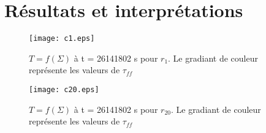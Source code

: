 \section{Résultats et interprétations}

\begin{figure}
  \begin{center}
    \texttt{[image: c1.eps]}
  \end{center}
  \caption{$T=f(\Sigma)$ à t = 26141802 s pour $r_{1}$. Le gradiant de couleur représente les valeurs de $\tau_{ff}$}
  \label{fig:c1.eps}
\end{figure} 

\begin{figure}
  \begin{center}
    \texttt{[image: c20.eps]}
  \end{center}
  \caption{$T=f(\Sigma)$ à t = 26141802 s pour $r_{20}$. Le gradiant de couleur représente les valeurs de $\tau_{ff}$}
  \label{fig:c20.eps}
\end{figure} 